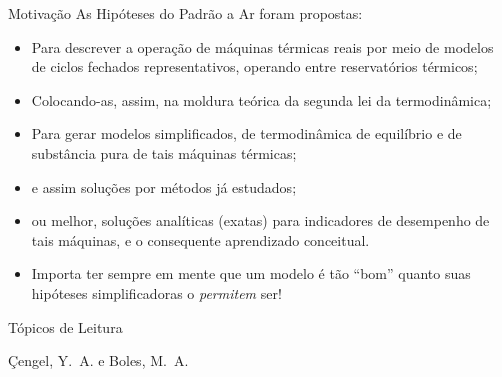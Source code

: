     \begin{frame}{Motivação}\vspace*{-1em}
        As Hipóteses do Padrão a Ar foram propostas:

        \begin{itemize}
            \item<1->  Para descrever a operação de \alert{máquinas térmicas reais} por meio de
                modelos de \alert{ciclos fechados} representativos, operando entre
                \alert{reservatórios térmicos};
            \item<2->  Colocando-as, assim, na moldura teórica da \alert{segunda lei} da
                termodinâmica;
            \item<3->  Para gerar \alert{modelos simplificados}, de termodinâmica de
                \alert{equilíbrio} e de \alert{substância pura} de tais \alert{máquinas
                térmicas};
            \item<4->  e assim soluções por \alert{métodos já estudados};
            \item<5->  ou melhor, \alert{soluções analíticas} (exatas) para \alert{indicadores
                de desempenho} de tais máquinas, e o consequente aprendizado conceitual.
            \item<6->  Importa ter sempre em mente que um \alert{modelo} é tão ``bom'' quanto
                suas \alert{hipóteses simplificadoras} o \emph{permitem} ser!
        \end{itemize}
    \end{frame}

    \begin{frame}[allowframebreaks]{Tópicos de Leitura}
        \begin{thebibliography}{Çengel, Y.~A., 2013}
                Çengel, Y.~A. e Boles, M.~A.
        \end{thebibliography}
    \end{frame}




